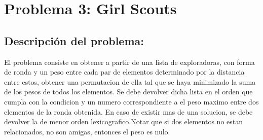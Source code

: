\documentclass[10pt, a4paper]{article}
\begin{document}
\section{Problema 3: Girl Scouts}
\subsection{Descripción del problema:}


El problema consiste en obtener a partir de una lista de exploradoras, con forma de ronda y un peso entre cada par de elementos determinado por la distancia entre estos, 
obtener una permutacion de ella tal que se haya minimizado la suma de los pesos de todos los elementos. Se debe devolver dicha lista en el orden que cumpla con 
la condicion y un numero correspondiente a el peso maximo entre dos elementos de la ronda obtenida. En caso de existir mas de una solucion, se debe devolver la de menor
orden lexicografico.Notar que si dos elementos no estan relacionados, no son amigas, entonces el peso es nulo.
\end{document}
